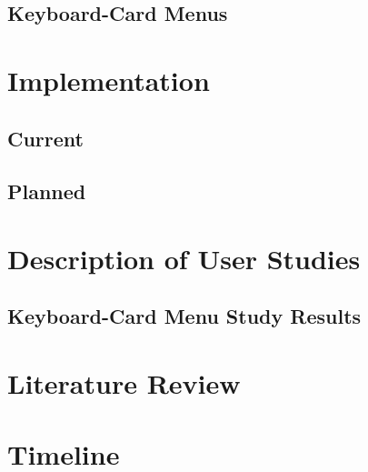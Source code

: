 \documentclass[11pt]{amsart}
\begin{document}
\subsection{Keyboard-Card Menus}

\section{Implementation}

\subsection{Current}

\subsection{Planned}


\section{Description of User Studies}


\subsection{Keyboard-Card Menu Study Results}

\section{Literature Review}



\section{Timeline}




\end{document}
